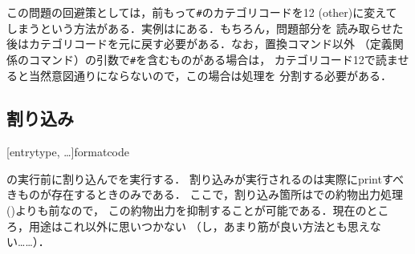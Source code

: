 \documentclass{jlreq}
\begin{document}
この問題の回避策としては，前もって\texttt{\#}のカテゴリコードを12 (other)に変えて
しまうという方法がある．実例はにある．もちろん，問題部分を
読み取らせた後はカテゴリコードを元に戻す必要がある．なお，置換コマンド以外
（定義関係のコマンド）の引数で\texttt{\#}を含むものがある場合は，
カテゴリコード12で読ませると当然意図通りにならないので，この場合は処理を
分割する必要がある．

\subsection{割り込み}

\begin{ltxsyntax}
  [entrytype, \dots]{format}{code}

  の実行前に割り込んでを実行する．
  割り込みが実行されるのは実際にprintすべきものが存在するときのみである．
  ここで，割り込み箇所はでの約物出力処理()よりも前なので，
  この約物出力を抑制することが可能である．現在のところ，用途はこれ以外に思いつかない
  （し，あまり筋が良い方法とも思えない……）．
\end{ltxsyntax}
\end{document}
